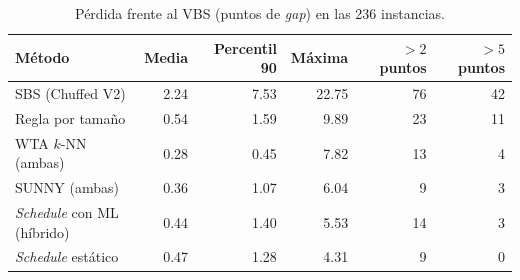 \begin{table}[H]
  \centering
  \small
  \singlespacing
  \caption{Pérdida frente al VBS (puntos de \textit{gap}) en las 236 instancias.}
  \label{tab:robustez}
  \begin{tabular}{lrrrrr}
    \toprule
    Método & Media & Percentil 90 & Máxima & $> 2$ puntos & $> 5$ puntos \\
    \midrule
    SBS (Chuffed V2) & 2.24 & 7.53 & 22.75 & 76 & 42 \\
    Regla por tamaño & 0.54 & 1.59 & 9.89 & 23 & 11 \\
    WTA $k$-NN (ambas) & 0.28 & 0.45 & 7.82 & 13 & 4 \\
    SUNNY (ambas) & 0.36 & 1.07 & 6.04 & 9 & 3 \\
    \textit{Schedule} con ML (híbrido) & 0.44 & 1.40 & 5.53 & 14 & 3 \\
    \textit{Schedule} estático & 0.47 & 1.28 & 4.31 & 9 & 0 \\
    \bottomrule
  \end{tabular}
\end{table}
